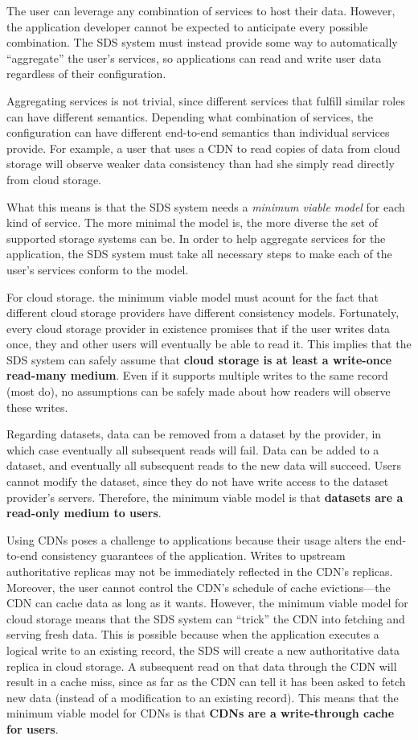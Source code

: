 The user can leverage any combination of services to host their data.  However,
the application developer cannot be expected to anticipate every possible
combination.  The SDS system must instead provide some way to automatically
``aggregate'' the user's services, so applications can read and
write user data regardless of their configuration.

Aggregating services is not trivial, since different services that fulfill
similar roles can have different semantics.  Depending what combination of
services, the configuration can have different end-to-end semantics than
individual services provide.  For example, a user that uses a CDN to read
copies of data from cloud storage will observe weaker data consistency than
had she simply read directly from cloud storage.

What this means is that the SDS system needs a \emph{minimum viable model} for each
kind of service.  The more minimal the model is, the more diverse the set of
supported storage systems can be.  In order to help aggregate services for the
application, the SDS system must take all necessary steps to make each of the
user's services conform to the model.

For cloud storage. the minimum viable model must acount for the fact that
different cloud storage providers have different consistency models.
Fortunately, every cloud storage provider in existence promises that if the user
writes data once, they and other users will eventually be able to read it.
This implies that the SDS system can safely assume that \textbf{cloud storage is
at least a write-once read-many medium}.  Even if it supports multiple writes to the
same record (most do), no assumptions can be safely made about how readers will
observe these writes.

Regarding datasets, data can be removed from a dataset by the provider, in which
case eventually all subsequent reads will fail.  Data can be added to a dataset,
and eventually all subsequent reads to the new data will succeed.  Users cannot modify the
dataset, since they do not have write access to the dataset provider's servers.
Therefore, the minimum viable model is that \textbf{datasets are a
read-only medium to users}.

Using CDNs poses a challenge to applications because their usage alters the
end-to-end consistency guarantees of the application.  Writes to upstream
authoritative replicas may not be immediately reflected in the CDN's replicas.
Moreover, the user cannot control the CDN's schedule of cache evictions---the CDN can cache data as long
as it wants.  However, the minimum viable model for cloud storage means that the
SDS system can ``trick'' the CDN into fetching and serving fresh data.  This is
possible because when the application executes a logical write to an existing
record, the SDS will create a new authoritative data replica in cloud storage.  A subsequent read on
that data through the CDN will result in a cache miss, since as far as the CDN
can tell it has been asked to fetch new data (instead of a modification to an
existing record).  This means that the minimum viable model for CDNs is that
\textbf{CDNs are a write-through cache for users}.

